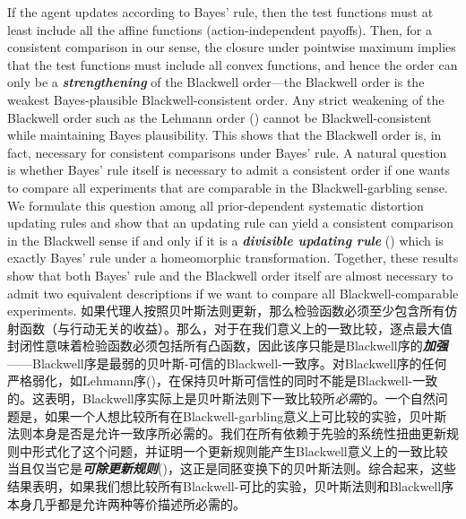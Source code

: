 \documentclass[12pt,letterpaper]{article}
\newenvironment{original}{\color{black}}{}
\newenvironment{translation}{\color{blue}}{}
\theoremstyle{plain}
\theoremstyle{definition}
\theoremstyle{remark}
\theoremstyle{definition}
\begin{document}
\begin{original}
If the agent updates according to Bayes' rule, then the test functions must at least include all the affine functions (action-independent payoffs). Then, for a consistent comparison in our sense, the closure under pointwise maximum implies that the test functions must include all convex functions, and hence the order can only be a \textit{\textbf{strengthening}} of the Blackwell order---the Blackwell order is the weakest Bayes-plausible Blackwell-consistent order. Any strict weakening of the Blackwell order such as the Lehmann order (\citealt{Lehmann}) cannot be Blackwell-consistent while maintaining Bayes plausibility. This shows that the Blackwell order is, in fact,  necessary for consistent comparisons under Bayes' rule. A natural question is whether Bayes' rule itself is necessary to admit a consistent order if one wants to compare all experiments that are comparable in the Blackwell-garbling sense. We formulate this question among all prior-dependent systematic distortion updating rules and show that an updating rule can yield a consistent comparison in the Blackwell sense if and only if it is a \textit{\textbf{divisible updating rule}} (\citealt{cripps2018divisible}) which is exactly Bayes' rule under a homeomorphic transformation. Together, these results show that both Bayes' rule and the Blackwell order itself are almost necessary to admit two equivalent descriptions if we want to compare all Blackwell-comparable experiments.
\end{original}
\begin{translation}
如果代理人按照贝叶斯法则更新，那么检验函数必须至少包含所有仿射函数（与行动无关的收益）。那么，对于在我们意义上的一致比较，逐点最大值封闭性意味着检验函数必须包括所有凸函数，因此该序只能是Blackwell序的\textit{\textbf{加强}}——Blackwell序是最弱的贝叶斯-可信的Blackwell-一致序。对Blackwell序的任何严格弱化，如Lehmann序(\citealt{Lehmann})，在保持贝叶斯可信性的同时不能是Blackwell-一致的。这表明，Blackwell序实际上是贝叶斯法则下一致比较所\textit{必需}的。一个自然问题是，如果一个人想比较所有在Blackwell-garbling意义上可比较的实验，贝叶斯法则本身是否是允许一致序所必需的。我们在所有依赖于先验的系统性扭曲更新规则中形式化了这个问题，并证明一个更新规则能产生Blackwell意义上的一致比较当且仅当它是\textit{\textbf{可除更新规则}}(\citealt{cripps2018divisible})，这正是同胚变换下的贝叶斯法则。综合起来，这些结果表明，如果我们想比较所有Blackwell-可比的实验，贝叶斯法则和Blackwell序本身几乎都是允许两种等价描述所必需的。
\end{translation}
\end{document}
